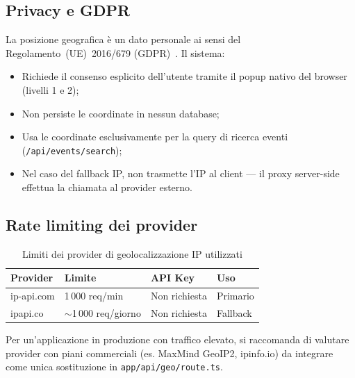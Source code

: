 \documentclass[12pt, a4paper]{article}
\begin{document}
\subsection{Privacy e GDPR}

La posizione geografica è un dato personale ai sensi del
Regolamento~(UE)~2016/679 (GDPR)~\cite{gdpr}. Il sistema:

\begin{itemize}[leftmargin=1.5em]
  \item Richiede il consenso esplicito dell'utente tramite il popup nativo del
    browser (livelli 1 e 2);
  \item Non persiste le coordinate in nessun database;
  \item Usa le coordinate esclusivamente per la query di ricerca eventi
    (\texttt{/api/events/search});
  \item Nel caso del fallback IP, non trasmette l'IP al client — il proxy
    server-side effettua la chiamata al provider esterno.
\end{itemize}

\subsection{Rate limiting dei provider}

\begin{table}[h!]
  \centering
  \caption{Limiti dei provider di geolocalizzazione IP utilizzati}
  \begin{tabularx}{\linewidth}{L{3cm} L{3.5cm} L{3.5cm} L{3cm}}
    \toprule
    \textbf{Provider} & \textbf{Limite} & \textbf{API Key} & \textbf{Uso} \\
    \midrule
    ip-api.com & 1\,000 req/min & Non richiesta & Primario \\
    ipapi.co   & $\sim$1\,000 req/giorno & Non richiesta & Fallback \\
    \bottomrule
  \end{tabularx}
\end{table}

Per un'applicazione in produzione con traffico elevato, si raccomanda di
valutare provider con piani commerciali (es. MaxMind GeoIP2, ipinfo.io) da
integrare come unica sostituzione in \texttt{app/api/geo/route.ts}.

\end{document}
